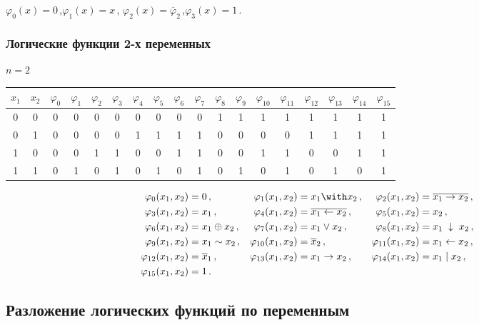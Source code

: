 $\varphi_0(x)=0\,$,\quad $\varphi_1(x)=x\,$,\quad
$\varphi_2(x)=\overline\varphi_2\,$,\quad $\varphi_3(x)=1\,$.

\subsubsection{Логические функции 2-х переменных} $n=2$

\begin{center} \tabcolsep=5dd
  \begin{tabular}{c|c||c|c|c|c|c|c|c|c|c|c|c|c|c|c|c|c|}
$x_1$&$x_2$&$\varphi_0$&$\varphi_1$&$\varphi_2$&$\varphi_3$&$\varphi_4$&$\varphi_5$&$\varphi_6$&$\varphi_7$&$\varphi_8$&$\varphi_9$&$\varphi_{10}$&$\varphi_{11}$&$\varphi_{12}$&$\varphi_{13}$&$\varphi_{14}$&$\varphi_{15}$\\
\hline\hline 0&0&0&0&0&0&0&0&0&0&1&1&1&1&1&1&1&1\\ \hline
0&1&0&0&0&0&1&1&1&1&0&0&0&0&1&1&1&1\\ \hline
1&0&0&0&1&1&0&0&1&1&0&0&1&1&0&0&1&1\\ \hline
1&1&0&1&0&1&0&1&0&1&0&1&0&1&0&1&0&1\\ \hline
  \end{tabular}
\end{center}

\begin{center}
  \begin{align*} \varphi_0(x_1,x_2)&=0\,,&
\varphi_1(x_1,x_2)&=x_1\with x_2\,,&
\varphi_2(x_1,x_2)&=\overline{x_1\to x_2}\,,\\
\varphi_3(x_1,x_2)&=x_1\,,&
\varphi_4(x_1,x_2)&=\overline{x_1\leftarrow x_2}\,,&
\varphi_5(x_1,x_2)&=x_2\,,\\ \varphi_6(x_1,x_2)&=x_1\oplus x_2\,,&
\varphi_7(x_1,x_2)&=x_1\lor x_2\,,&
\varphi_8(x_1,x_2)&=x_1\;\downarrow\;x_2\,,&\\
\varphi_9(x_1,x_2)&=x_1\sim x_2\,,& \varphi_{10}(x_1,x_2)&=\overline
x_2\,,& \varphi_{11}(x_1,x_2)&=x_1\leftarrow x_2\,,\\
\varphi_{12}(x_1,x_2)&=\overline x_1\,,&
\varphi_{13}(x_1,x_2)&=x_1\rightarrow x_2\,,&
\varphi_{14}(x_1,x_2)&=x_1\mid x_2\,,\\ \varphi_{15}(x_1,x_2)&=1\,.
  \end{align*}
\end{center}

\subsection{Разложение логических функций по переменным}

